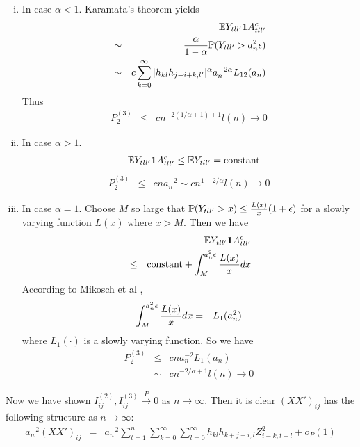 \documentclass{article}
\begin{document}
\begin{enumerate}[i)]
\item In case $\alpha < 1$. Karamata's theorem yields
  \begin{eqnarray*}
    && \E Y_{tll'}\I{A^c_{tll'}} \\
    &\sim& {\alpha \over 1 -\alpha} \P(Y_{tll'} > a_n^2 \epsilon) \\
    &\sim& c \sum_{k=0}^\infty |h_{kl}h_{j-i+k,l'}|^{\alpha}
           a_n^{-2\alpha} L_{12}(a_n) \\
  \end{eqnarray*}
  Thus
  \begin{eqnarray*}
    P^{(3)}_2 &\leq& c n^{-2(1/\alpha + 1)+1}l(n) \to 0
  \end{eqnarray*}

\item In case $\alpha > 1$. 
  \begin{eqnarray*}
    && \E Y_{tll'} \I{A^c_{tll'}} \leq \E Y_{tll'} = \text{constant}
  \end{eqnarray*}
  \begin{eqnarray*}
    P^{(3)}_2 &\leq& cna_n^{-2} \sim c n^{1-2/\alpha} l(n) \to 0
  \end{eqnarray*}
\item In case $\alpha=1$.
  Choose $M$ so large that $\P(Y_{tll'} > x) \leq {L(x) \over x}
  (1 + \epsilon)$ for a slowly varying function $L(x)$
  where $x > M$. Then we have
  \begin{eqnarray*}
    && \E Y_{tll'} \I{A^c_{tll'}} \\
    &\leq& \text{constant} + \int_{M}^{a_n^2 \epsilon}
           {L(x) \over x} dx
  \end{eqnarray*}
  According to Mikosch et al \cite{Embrechts1997},
  \begin{eqnarray*}
    \int_{M}^{a_n^2 \epsilon}
    {L(x) \over x} dx &=& L_1(a_n^2)
  \end{eqnarray*}
  where $L_1(\cdot)$ is a slowly varying function. So we have
  \begin{eqnarray*}
    P^{(3)}_2 &\leq& c n a_n^{-2} L_1(a_n)\\
    &\sim& c n^{-2/\alpha + 1} l(n) \to 0
  \end{eqnarray*}
\end{enumerate}
Now we have shown $I^{(2)}_{ij}, I^{(3)}_{ij} \xrightarrow{P} 0$ as $n
\to \infty$. Then it is clear $(XX')_{ij}$ has the following structure
as $n \to \infty$:
\begin{eqnarray*}
  a_n^{-2}(XX')_{ij} &=& a_n^{-2} \sum_{t=1}^n \sum_{k=0}^\infty \sum_{l=0}^\infty
  h_{kl} h_{k+j-i,l} Z_{i-k, t-l}^2 + o_P(1)
\end{eqnarray*}
\end{document}
